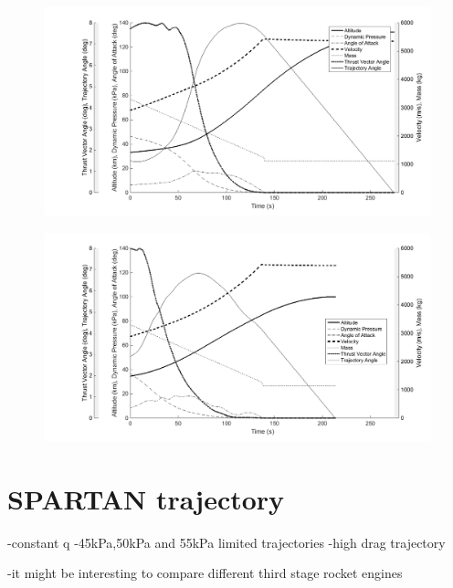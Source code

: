 \begin{figure}
\centering
\includegraphics[width=0.9\linewidth]{figures/5_Ascent/ThirdStageConstQ}
\caption{}
\label{fig:ThirdStageConstQ}
\end{figure}
\begin{figure}
\centering
\includegraphics[width=0.9\linewidth]{figures/5_Ascent/ThirdStage50kpaconstrained}
\caption{}
\label{fig:ThirdStage50kpaconstrained}
\end{figure}



\section{SPARTAN trajectory}
-constant q
-45kPa,50kPa and 55kPa limited trajectories
-high drag trajectory

-it might be interesting to compare different third stage rocket engines 

